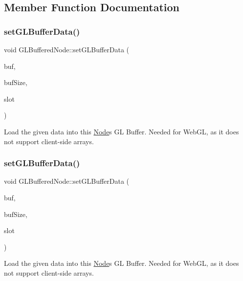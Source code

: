 \subsection{Member Function Documentation}
\mbox{\label{classGLBufferedNode_a7799428baab534f9b49a8b7467f56849}} 
\subsubsection{\texorpdfstring{set\+G\+L\+Buffer\+Data()}{setGLBufferData()}\hspace{0.1cm}{\footnotesize\ttfamily [1/2]}}
{\footnotesize\ttfamily void G\+L\+Buffered\+Node\+::set\+G\+L\+Buffer\+Data (\begin{DoxyParamCaption}\item[{void $\ast$}]{buf,  }\item[{G\+Luint}]{buf\+Size,  }\item[{int}]{slot }\end{DoxyParamCaption})}

Load the given data into this \hyperlink{classNode}{Node}\textquotesingle{}s GL Buffer. Needed for Web\+GL, as it does not support client-\/side arrays. \mbox{\label{classGLBufferedNode_a7799428baab534f9b49a8b7467f56849}} 
\subsubsection{\texorpdfstring{set\+G\+L\+Buffer\+Data()}{setGLBufferData()}\hspace{0.1cm}{\footnotesize\ttfamily [2/2]}}
{\footnotesize\ttfamily void G\+L\+Buffered\+Node\+::set\+G\+L\+Buffer\+Data (\begin{DoxyParamCaption}\item[{void $\ast$}]{buf,  }\item[{G\+Luint}]{buf\+Size,  }\item[{int}]{slot }\end{DoxyParamCaption})}

Load the given data into this \hyperlink{classNode}{Node}\textquotesingle{}s GL Buffer. Needed for Web\+GL, as it does not support client-\/side arrays. 

